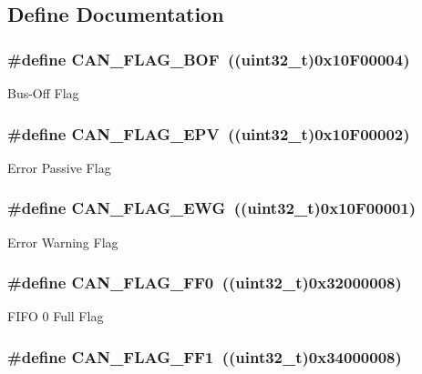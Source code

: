 \subsection{Define Documentation}
\hypertarget{group__CAN__flags_ga65f20612d0bf1692003882c0cdbadb1c}{
\subsubsection[{CAN\_\-FLAG\_\-BOF}]{\setlength{\rightskip}{0pt plus 5cm}\#define CAN\_\-FLAG\_\-BOF~((uint32\_\-t)0x10F00004)}}
\label{group__CAN__flags_ga65f20612d0bf1692003882c0cdbadb1c}
Bus-\/Off Flag \hypertarget{group__CAN__flags_ga61954e54995f638ed78281ad2b0cf43a}{
\subsubsection[{CAN\_\-FLAG\_\-EPV}]{\setlength{\rightskip}{0pt plus 5cm}\#define CAN\_\-FLAG\_\-EPV~((uint32\_\-t)0x10F00002)}}
\label{group__CAN__flags_ga61954e54995f638ed78281ad2b0cf43a}
Error Passive Flag \hypertarget{group__CAN__flags_gae8906ba9c4031866c5096418ffa9bf71}{
\subsubsection[{CAN\_\-FLAG\_\-EWG}]{\setlength{\rightskip}{0pt plus 5cm}\#define CAN\_\-FLAG\_\-EWG~((uint32\_\-t)0x10F00001)}}
\label{group__CAN__flags_gae8906ba9c4031866c5096418ffa9bf71}
Error Warning Flag \hypertarget{group__CAN__flags_ga11648741ff43af1561ce7009698fb797}{
\subsubsection[{CAN\_\-FLAG\_\-FF0}]{\setlength{\rightskip}{0pt plus 5cm}\#define CAN\_\-FLAG\_\-FF0~((uint32\_\-t)0x32000008)}}
\label{group__CAN__flags_ga11648741ff43af1561ce7009698fb797}
FIFO 0 Full Flag \hypertarget{group__CAN__flags_ga0fa967743c5db04189bb2160aa48e371}{
\subsubsection[{CAN\_\-FLAG\_\-FF1}]{\setlength{\rightskip}{0pt plus 5cm}\#define CAN\_\-FLAG\_\-FF1~((uint32\_\-t)0x34000008)}}
